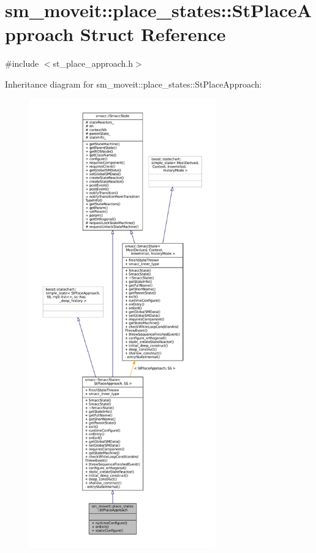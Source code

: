 \hypertarget{structsm__moveit_1_1place__states_1_1StPlaceApproach}{}\section{sm\+\_\+moveit\+:\+:place\+\_\+states\+:\+:St\+Place\+Approach Struct Reference}
\label{structsm__moveit_1_1place__states_1_1StPlaceApproach}


{\ttfamily \#include $<$st\+\_\+place\+\_\+approach.\+h$>$}



Inheritance diagram for sm\+\_\+moveit\+:\+:place\+\_\+states\+:\+:St\+Place\+Approach\+:
\nopagebreak
\begin{figure}[H]
\begin{center}
\leavevmode
\includegraphics[height=550pt]{structsm__moveit_1_1place__states_1_1StPlaceApproach__inherit__graph}
\end{center}
\end{figure}


